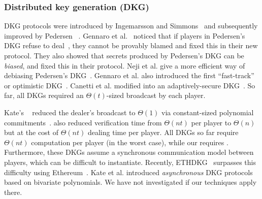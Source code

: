 \subsubsection{Distributed key generation (DKG)}
DKG protocols were introduced by Ingemarsson and Simmons~\cite{Ingemarsson1991} and subsequently improved by Pedersen ~\cite{Pedersen1991AThreshold,Pedersen1991Noninteractive}.
Gennaro et al.~\cite{dkg} noticed that if players in Pedersen's DKG refuse to deal~\cite{Pedersen1991AThreshold}, they cannot be provably blamed and fixed this in their new \jfdkg protocol.
They also showed that secrets produced by Pedersen's DKG can be \textit{biased}, and fixed this in their \newdkg protocol.
Neji et al. give a more efficient way of debiasing Pedersen's DKG~\cite{NBB16}.
Gennaro et al. also introduced the first ``fast-track'' or optimistic DKG~\cite{GRR98p}.
Canetti et al. modified \newdkg into an adaptively-secure DKG~\cite{Canetti1999Adaptive}.
So far, all DKGs required an $\Theta(t)$-sized broadcast by each player.

Kate's \ejfdkg~\cite{Kate2010Distributed} reduced the dealer's broadcast to $\Theta(1)$ via constant-sized polynomial commitments~\cite{polycommit}.
\ejfdkg also reduced verification time from $\Theta(nt)$ per player to $\Theta(n)$ but at the cost of $\Theta(nt)$ dealing time per player.
All DKGs so far require $\Theta(nt)$ computation per player (in the worst case), while our \ourdkg requires \amtDealTime.
Furthermore, these DKGs assume a synchronous communication model between players, which can be difficult to instantiate.
Recently, ETHDKG~\cite{SJSW19} surpasses this difficulty using Ethereum~\cite{ethereum}.
Kate et al. introduced \textit{asynchronous} DKG protocols~\cite{Kate2010Distributed,KateGoldberg2009Distributed} based on bivariate polynomials.
We have not investigated if our techniques apply there.

